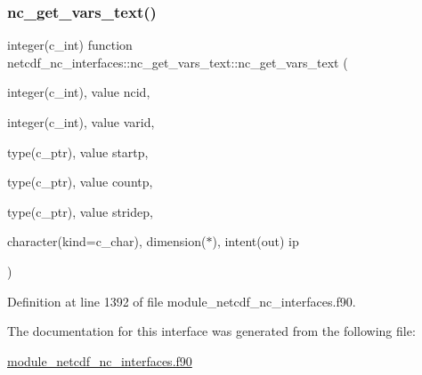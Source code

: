 \subsubsection{\texorpdfstring{nc\+\_\+get\+\_\+vars\+\_\+text()}{nc\_get\_vars\_text()}}
{\footnotesize\ttfamily integer(c\+\_\+int) function netcdf\+\_\+nc\+\_\+interfaces\+::nc\+\_\+get\+\_\+vars\+\_\+text\+::nc\+\_\+get\+\_\+vars\+\_\+text (\begin{DoxyParamCaption}\item[{integer(c\+\_\+int), value}]{ncid,  }\item[{integer(c\+\_\+int), value}]{varid,  }\item[{type(c\+\_\+ptr), value}]{startp,  }\item[{type(c\+\_\+ptr), value}]{countp,  }\item[{type(c\+\_\+ptr), value}]{stridep,  }\item[{character(kind=c\+\_\+char), dimension($\ast$), intent(out)}]{ip }\end{DoxyParamCaption})}



Definition at line 1392 of file module\+\_\+netcdf\+\_\+nc\+\_\+interfaces.\+f90.



The documentation for this interface was generated from the following file\+:\begin{DoxyCompactItemize}
\item 
\hyperlink{module__netcdf__nc__interfaces_8f90}{module\+\_\+netcdf\+\_\+nc\+\_\+interfaces.\+f90}\end{DoxyCompactItemize}
